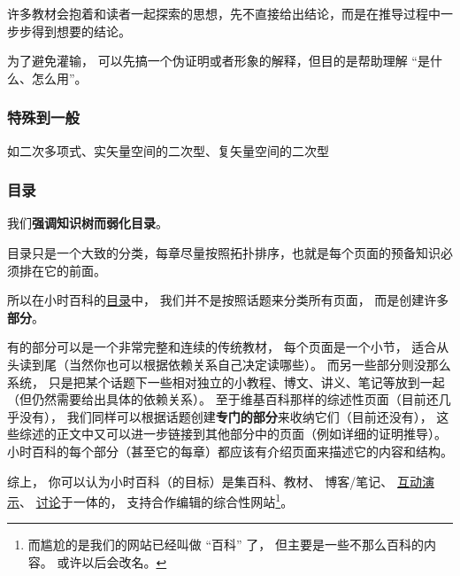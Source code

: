 许多教材会抱着和读者一起探索的思想，先不直接给出结论，而是在推导过程中一步步得到想要的结论。

为了避免灌输， 可以先搞一个伪证明或者形象的解释，但目的是帮助理解 “是什么、怎么用”。

\subsubsection{特殊到一般}
如二次多项式、实矢量空间的二次型、复矢量空间的二次型

\subsubsection{目录}
我们\textbf{强调知识树而弱化目录}。 

目录只是一个大致的分类，每章尽量按照拓扑排序，也就是每个页面的预备知识必须排在它的前面。

所以在小时百科的\href{http://wuli.wiki/online}{目录}中， 我们并不是按照话题来分类所有页面， 而是创建许多\textbf{部分}。

有的部分可以是一个非常完整和连续的传统教材， 每个页面是一个小节， 适合从头读到尾（当然你也可以根据依赖关系自己决定读哪些）。 而另一些部分则没那么系统， 只是把某个话题下一些相对独立的小教程、博文、讲义、笔记等放到一起（但仍然需要给出具体的依赖关系）。 至于维基百科那样的综述性页面（目前还几乎没有）， 我们同样可以根据话题创建\textbf{专门的部分}来收纳它们（目前还没有）， 这些综述的正文中又可以进一步链接到其他部分中的页面（例如详细的证明推导）。 小时百科的每个部分（甚至它的每章）都应该有介绍页面来描述它的内容和结构。

综上， 你可以认为小时百科（的目标）是集百科、教材、 博客/笔记、 \href{http://wuli.wiki/apps}{互动演示}、 \href{http://wuli.wiki/forum}{讨论}于一体的， 支持合作编辑的综合性网站\footnote{而尴尬的是我们的网站已经叫做 “百科” 了， 但主要是一些不那么百科的内容。 或许以后会改名。}。




